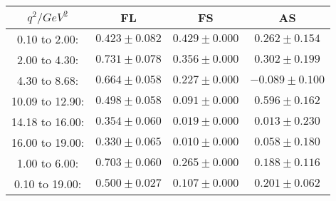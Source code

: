 \begin{table}[tbp]
\centering
\begin{tabular}{|c|c|c|c|}
\hline
$q^2 / GeV^2$  & FL   & FS  & AS  \\
\hline
0.10 to  2.00:  & $0.423 \pm 0.082$ & $0.429 \pm 0.000$ & $0.262 \pm 0.154$ \\ 
 2.00 to  4.30:  & $0.731 \pm 0.078$ & $0.356 \pm 0.000$ & $0.302 \pm 0.199$ \\ 
 4.30 to  8.68:  & $0.664 \pm 0.058$ & $0.227 \pm 0.000$ & $-0.089 \pm 0.100$ \\ 
 10.09 to  12.90:  & $0.498 \pm 0.058$ & $0.091 \pm 0.000$ & $0.596 \pm 0.162$ \\ 
 14.18 to  16.00:  & $0.354 \pm 0.060$ & $0.019 \pm 0.000$ & $0.013 \pm 0.230$ \\ 
 16.00 to  19.00:  & $0.330 \pm 0.065$ & $0.010 \pm 0.000$ & $0.058 \pm 0.180$ \\ 
 1.00 to  6.00:  & $0.703 \pm 0.060$ & $0.265 \pm 0.000$ & $0.188 \pm 0.116$ \\ 
 0.10 to  19.00:  & $0.500 \pm 0.027$ & $0.107 \pm 0.000$ & $0.201 \pm 0.062$ \\ 
 \hline
\end{tabular}
\end{table}
